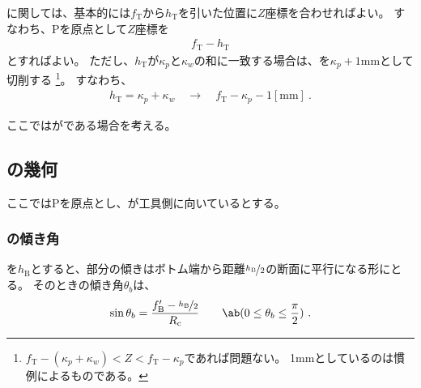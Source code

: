 \clearpage
\modHeadsection{\TopOutcutLength}
\TopOutcutLength に関しては、基本的には\AlocationLength$f_\mathrm T$から\TopOutcutLength$h_\mathrm T$を引いた位置に$Z$座標を合わせればよい。
すなわち、\TableCenter Pを原点として$Z$座標を
\begin{align*}
  f_\mathrm T - h_\mathrm T
\end{align*}
とすればよい。
ただし、\TopOutcutLength$h_\mathrm T$が\KeywayPos$\kappa_p$と\KeywayWidth$\kappa_w$の和に一致する場合は、\TopOutcutLength を$\kappa_p+1$mmとして切削する
\footnote{$f_\mathrm T-(\kappa_p+\kappa_w) < Z < f_\mathrm T-\kappa_p$であれば問題ない。
1mmとしているのは慣例によるものである。}。
すなわち、
\begin{align*}
  h_\mathrm T = \kappa_p+\kappa_w \quad \longrightarrow \quad f_\mathrm T-\kappa_p-1[\mathrm{mm}]\ .
\end{align*}



\clearpage
ここでは\Outcut が\CurvedOutcut である場合を考える。


\subsection{\BottomCurvedOutcut の幾何}
ここでは\TableCenter Pを原点とし、\BottomEndFace が工具側に向いているとする。

\subsubsection{\BottomCurvedOutcut の傾き角}
\BottomOutcutLength を$h_\mathrm B$とすると、\nameCurvedOutcut 部分の傾きはボトム端から距離$\nicefrac{h_\mathrm B}2$の断面に平行になる形にとる。
そのときの傾き角$\theta_b$は、
\begin{align}
  \label{eq:BCurvedOutcutAngle}
  \sin\theta_b = \frac{f_\mathrm B'-\nicefrac{h_\mathrm B}2}{R_\mathrm c}
  \qquad\ab(0 \leq \theta_b \leq \frac\pi2)\ .
\end{align}

